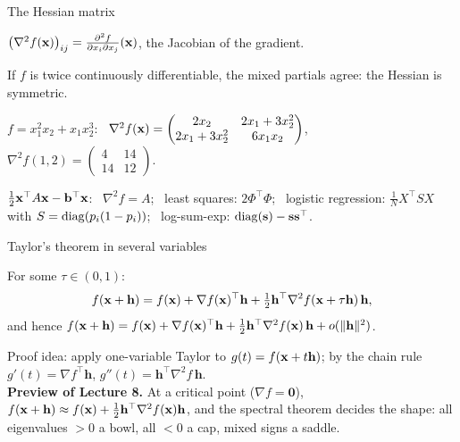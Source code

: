 \documentclass[aspectratio=1610,11pt]{beamer}
\begin{document}

\begin{frame}{The Hessian matrix}
    \begin{definition}
        \small $\big(\nabla^2 f(\mathbf{x})\big)_{ij} = \frac{\partial^2 f}{\partial x_i\partial x_j}(\mathbf{x})$, the Jacobian of the gradient.
    \end{definition}
    \begin{theorem}
        \small If $f$ is twice continuously differentiable, the mixed partials agree: the Hessian is symmetric.
    \end{theorem}
    \small
    \begin{example}[][ex:hessian]
        $f = x_1^2x_2 + x_1x_2^3$: \ $\nabla^2 f(\mathbf{x}) = \begin{pmatrix} 2x_2 & 2x_1 + 3x_2^2 \\ 2x_1 + 3x_2^2 & 6x_1x_2 \end{pmatrix}$, \ $\nabla^2 f(1, 2) = \begin{pmatrix} 4 & 14 \\ 14 & 12 \end{pmatrix}$.
    \end{example}
    \begin{example}
        $\frac{1}{2}\mathbf{x}^\top A\mathbf{x} - \mathbf{b}^\top\mathbf{x}$: \ $\nabla^2 f = A$; \ least squares: $2\Phi^\top\Phi$; \ logistic regression: $\frac{1}{N}X^\top SX$ with $S = \operatorname{diag}(p_i(1 - p_i))$; \ log-sum-exp: $\operatorname{diag}(\mathbf{s}) - \mathbf{s}\mathbf{s}^\top$.
    \end{example}
\end{frame}

\begin{frame}{Taylor's theorem in several variables}
    \begin{theorem}
        \small For some $\tau \in (0, 1)$:
        \[f(\mathbf{x} + \mathbf{h}) = f(\mathbf{x}) + \nabla f(\mathbf{x})^\top\mathbf{h} + \tfrac{1}{2}\mathbf{h}^\top\nabla^2 f(\mathbf{x} + \tau\mathbf{h})\,\mathbf{h},\]
        and hence $f(\mathbf{x} + \mathbf{h}) = f(\mathbf{x}) + \nabla f(\mathbf{x})^\top\mathbf{h} + \frac{1}{2}\mathbf{h}^\top\nabla^2 f(\mathbf{x})\,\mathbf{h} + o(\lVert \mathbf{h} \rVert^2)$.
    \end{theorem}
    \small
    Proof idea: apply one-variable Taylor to $g(t) = f(\mathbf{x} + t\mathbf{h})$; by the chain rule $g'(t) = \nabla f^\top\mathbf{h}$, $g''(t) = \mathbf{h}^\top\nabla^2 f\,\mathbf{h}$.
    \\[0.5em]
    \textbf{Preview of Lecture 8.} At a critical point ($\nabla f = \mathbf{0}$), $f(\mathbf{x} + \mathbf{h}) \approx f(\mathbf{x}) + \frac{1}{2}\mathbf{h}^\top\nabla^2 f(\mathbf{x})\mathbf{h}$, and the spectral theorem decides the shape: all eigenvalues $> 0$ a bowl, all $< 0$ a cap, mixed signs a saddle.
\end{frame}
\end{document}
